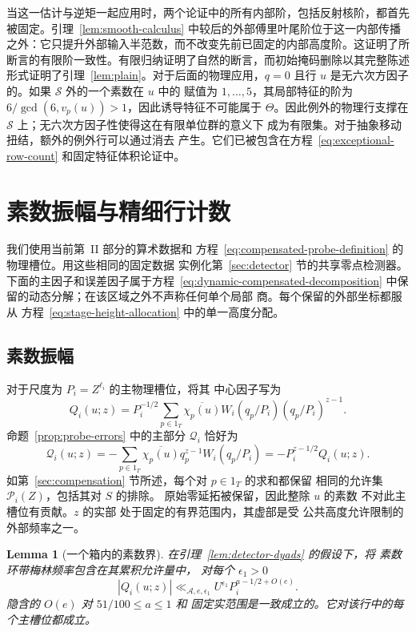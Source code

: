 \documentclass[11pt,a4paper]{article}
\numberwithin{equation}{section}
\numberwithin{figure}{section}
\newtheorem{lemma}[theorem]{Lemma}
\theoremstyle{definition}
\theoremstyle{remark}
\begin{document}
当这一估计与逆矩一起应用时，两个论证中的所有内部阶，包括反射核阶，都首先被固定。引理~\ref{lem:smooth-calculus} 中较后的外部傅里叶尾阶位于这一内部传播之外：它只提升外部输入半范数，而不改变先前已固定的内部高度阶。这证明了所断言的有限阶一致性。有限归纳证明了自然的断言，而初始掩码删除以其完整陈述形式证明了引理~\ref{lem:plain}。对于后面的物理应用，\(q=0\) 且行 \(u\)
是无六次方因子的。如果 \(\mathcal S\) 外的一个素数在 \(u\) 中的
赋值为 \(1,\ldots,5\)，其局部特征的阶为
\(6/\gcd(6,v_p(u))>1\)，因此诱导特征不可能属于
\(\Theta\)。因此例外的物理行支撑在
\(\mathcal S\) 上；无六次方因子性使得这在有限单位群的意义下
成为有限集。对于抽象移动扭结，额外的例外行可以通过消去
产生。它们已被包含在方程~\eqref{eq:exceptional-row-count}
和固定特征体积论证中。
\section{素数振幅与精细行计数}\label{sec:refined-row-counts}

我们使用当前第~II 部分的算术数据和
方程~\eqref{eq:compensated-probe-definition} 的物理槽位。用这些相同的固定数据
实例化第~\ref{sec:detector} 节的共享零点检测器。
下面的主因子和误差因子属于方程~\eqref{eq:dynamic-compensated-decomposition}
中保留的动态分解；在该区域之外不声称任何单个局部
商。每个保留的外部坐标都服从
方程~\eqref{eq:stage-height-allocation} 中的单一高度分配。

\subsection{素数振幅}\label{sec:amplitudes}

对于尺度为 \(P_i=Z^{\ell_i}\) 的主物理槽位，将其
中心因子写为
\[
 Q_i(u;z)=P_i^{-1/2}\sum_{p\in1_T}
   \overline{\chi_p(u)}W_i(q_p/P_i)(q_p/P_i)^{z-1}.
\]
命题~\ref{prop:probe-errors} 中的主部分 \(\mathcal Q_i\) 恰好为
\[
 \mathcal Q_i(u;z)=-\sum_{p\in1_T}\overline{\chi_p(u)}q_p^{z-1}W_i(q_p/P_i)
 =-P_i^{z-1/2}Q_i(u;z).
\]
如第~\ref{sec:compensation} 节所述，每个对 \(p\in1_T\) 的求和都保留
相同的允许集 \(\mathcal P_i(Z)\)，包括其对 \(S\) 的排除。
原始零延拓被保留，因此整除 \(u\) 的素数
不对此主槽位有贡献。\(z\) 的实部
处于固定的有界范围内，其虚部是受
公共高度允许限制的外部频率之一。

\begin{lemma}[一个箱内的素数界]\label{lem:bin-prime-bound}
在引理~\ref{lem:detector-dyads} 的假设下，将
素数环带梅林频率包含在其累积允许量中，
对每个 \(\epsilon_1>0\)
\[
 |Q_i(u;z)|\ll_{\mathcal A,e,\epsilon_1}
 U^{\epsilon_1}P_i^{a-1/2+O(e)}.
\]
隐含的 \(O(e)\) 对 \(51/100\le a\le1\) 和
固定实范围是一致成立的。它对该行中的每个主槽位都成立。
\end{lemma}
\end{document}

